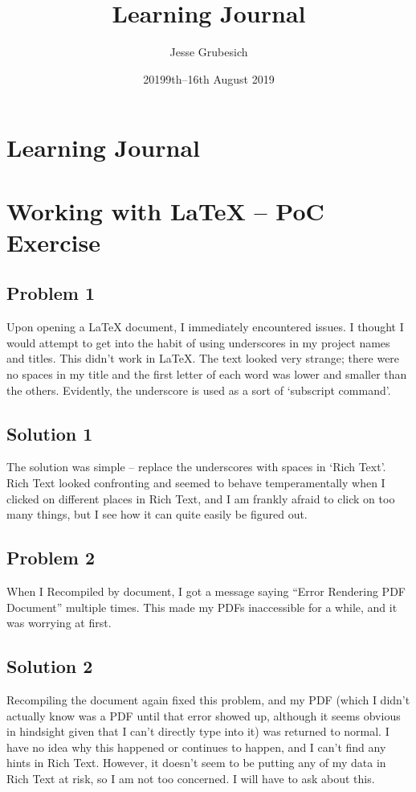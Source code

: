 \documentclass{article}
\title{Learning Journal}
\author{Jesse Grubesich}
\date{2019}
\begin{document}
\maketitle

\section{Learning Journal}



\date{9th–16th August 2019}

\section{Working with LaTeX – PoC Exercise}
\subsection{Problem 1}
Upon opening a LaTeX document, I immediately encountered issues. I thought I would attempt to get into the habit of using underscores in my project names and titles. This didn’t work in LaTeX. The text looked very strange; there were no spaces in my title and the first letter of each word was lower and smaller than the others. Evidently, the underscore is used as a sort of ‘subscript command’.
\subsection{Solution 1}
The solution was simple – replace the underscores with spaces in ‘Rich Text’. Rich Text looked confronting and seemed to behave temperamentally when I clicked on different places in Rich Text, and I am frankly afraid to click on too many things, but I see how it can quite easily be figured out.

\subsection{Problem 2}
When I Recompiled by document, I got a message saying “Error Rendering PDF Document” multiple times. This made my PDFs inaccessible for a while, and it was worrying at first.
\subsection{Solution 2}
Recompiling the document again fixed this problem, and my PDF (which I didn’t actually know was a PDF until that error showed up, although it seems obvious in hindsight given that I can’t directly type into it) was returned to normal. I have no idea why this happened or continues to happen, and I can’t find any hints in Rich Text. However, it doesn’t seem to be putting any of my data in Rich Text at risk, so I am not too concerned. I will have to ask about this.
\end{document}
